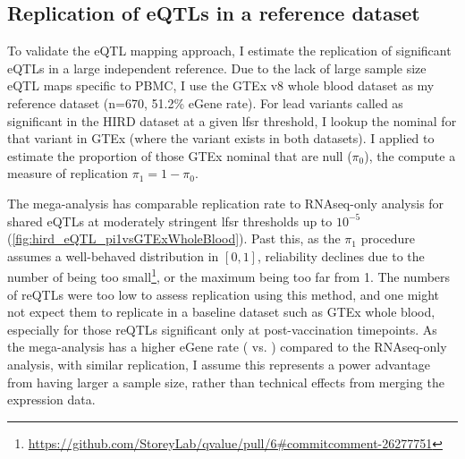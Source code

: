 \subsection{Replication of eQTLs in a reference dataset}

To validate the \gls{eQTL} mapping approach, I estimate the replication of significant eQTLs in a large independent reference.
Due to the lack of large sample size \gls{eQTL} maps specific to \gls{PBMC}, I use the GTEx v8 whole blood dataset as my reference dataset (n=670, 51.2\% eGene rate).
For lead variants called as significant in the \gls{HIRD} dataset at a given lfsr threshold, I lookup the nominal \pvalue{} for that variant in GTEx (where the variant exists in both datasets).
I applied  to estimate the proportion of those GTEx nominal \pvalues{} that are null ($\pi_0$), the compute a measure of replication $\pi_1 = 1 - \pi_0$.

The mega-analysis has comparable replication rate to \gls{RNAseq}-only analysis for shared \glspl{eQTL} at moderately stringent \gls{lfsr} thresholds up to $10^{-5}$ (\cref{fig:hird_eQTL_pi1vsGTExWholeBlood}).
Past this, as the $\pi_1$ procedure assumes a well-behaved \pvalue distribution in $\left[0, 1\right]$, 
reliability declines due to the number of \pvalues{} being too small\footnote{\url{https://github.com/StoreyLab/qvalue/pull/6\#commitcomment-26277751}}, or the maximum \pvalue{} being too far from 1.
The numbers of \glspl{reQTL} were too low to assess replication using this method, and one might not expect them to replicate in a baseline dataset such as GTEx whole blood, especially for those \glspl{reQTL} significant only at post-vaccination timepoints.
As the mega-analysis has a higher eGene rate ( vs. ) compared to the \gls{RNAseq}-only analysis, with similar replication,
I assume this represents a power advantage from having larger a sample size, rather than technical effects from merging the expression data.

